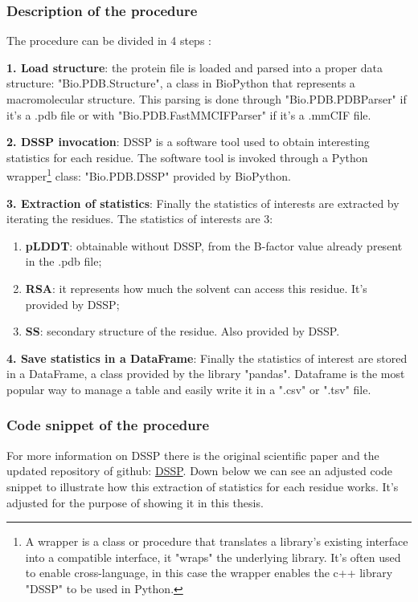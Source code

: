 \subsubsection{Description of the procedure}
The procedure can be divided in 4 steps :
\begin{description}
    \item \textbf{1. Load structure}: the protein file is loaded and parsed into a proper data structure: "Bio.PDB.Structure", a class in BioPython that represents a macromolecular structure. This parsing is done through "Bio.PDB.PDBParser" if it's a .pdb file or with "Bio.PDB.FastMMCIFParser" if it's a .mmCIF file.
    
    \item \textbf{2. DSSP invocation}: DSSP is a software tool used to obtain interesting statistics for each residue. The software tool is invoked through a Python wrapper\footnote{A wrapper is a class or procedure that translates a library's existing interface into a compatible interface, it "wraps" the underlying library. It's often used to enable cross-language, in this case the wrapper enables the c++ library "DSSP" to be used in Python.} class: "Bio.PDB.DSSP" provided by BioPython. 
    
    \item \textbf{3. Extraction of statistics}: Finally the statistics of interests are extracted by iterating the residues. The statistics of interests are 3: 
    \begin{enumerate}
        \item \textbf{pLDDT}: obtainable without DSSP, from the B-factor value already present in the .pdb file;
        \item \textbf{RSA}: it represents how much the solvent can access this residue. It's provided by DSSP;
        \item \textbf{SS}: secondary structure of the residue. Also provided by DSSP.
    \end{enumerate}
    
    
    \item \textbf{4. Save statistics in a DataFrame}: Finally the statistics of interest are stored in a DataFrame, a class provided by the library "pandas". Dataframe is the most popular way to manage a table and easily write it in a ".csv" or ".tsv" file. 
\end{description}


\subsubsection{Code snippet of the procedure}
For more information on DSSP there is the original scientific paper \cite{og-dssp} and the updated repository of github: \hyperlink{https://github.com/PDB-REDO/dssp}{DSSP}.
Down below we can see an adjusted code snippet to illustrate how this extraction of statistics for each residue works. It's adjusted for the purpose of showing it in this thesis.

